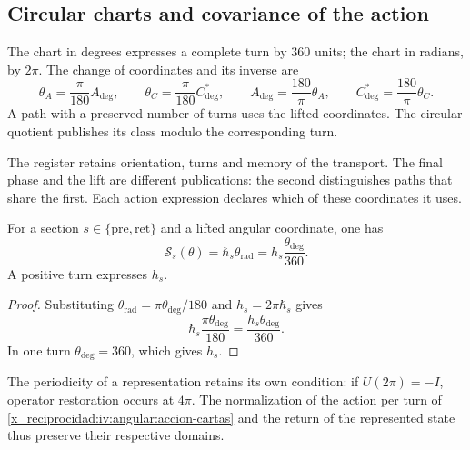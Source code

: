 \subsection{Circular charts and covariance of the action}
\label{x_reciprocidad:iv:angular:cartas}

\begin{definition}
\label{x_reciprocidad:iv:angular:unidades}
The chart in degrees expresses a complete turn by \(360\)
units; the chart in radians, by \(2\pi\). The change
of coordinates and its inverse are
\begin{equation}
 \theta_A=\frac{\pi}{180}A_{\deg},\qquad
 \theta_C=\frac{\pi}{180}C^*_{\deg},\qquad
 A_{\deg}=\frac{180}{\pi}\theta_A,\qquad
 C^*_{\deg}=\frac{180}{\pi}\theta_C.
 \label{x_reciprocidad:iv:angular:cambio-carta}
\end{equation}
A path with a preserved number of turns uses the
lifted coordinates. The circular quotient publishes its
class modulo the corresponding turn.
\end{definition}

The register retains orientation, turns and memory of the transport.
The final phase and the lift are different publications:
the second distinguishes paths that share the first.
Each action expression declares which of these coordinates it uses.

\begin{proposition}
\label{x_reciprocidad:iv:angular:accion}
For a section \(s\in\{\mathrm{pre},\mathrm{ret}\}\) and a
lifted angular coordinate, one has
\begin{equation}
 \mathcal S_s(\theta)
 =\hbar_s\theta_{\mathrm{rad}}
 =h_s\frac{\theta_{\deg}}{360}.
 \label{x_reciprocidad:iv:angular:accion-cartas}
\end{equation}
A positive turn expresses \(h_s\).
\end{proposition}
\begin{proof}
Substituting
\(\theta_{\mathrm{rad}}=\pi\theta_{\deg}/180\) and
\(h_s=2\pi\hbar_s\) gives
\[
 \hbar_s\frac{\pi\theta_{\deg}}{180}
 =\frac{h_s\theta_{\deg}}{360}.
\]
In one turn \(\theta_{\deg}=360\), which gives \(h_s\).
\end{proof}

The periodicity of a representation retains its own
condition: if \(U(2\pi)=-I\), operator restoration occurs
at \(4\pi\). The normalization of the action per turn of
\eqref{x_reciprocidad:iv:angular:accion-cartas} and the return of the represented
state thus preserve their respective domains.

